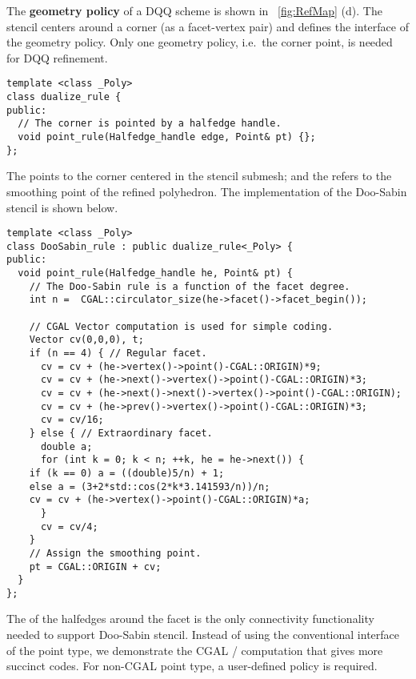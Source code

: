 \noindent The \textbf{geometry policy} of a DQQ scheme is shown in
\figurename\ \ref{fig:RefMap} (d). The stencil centers around
a corner (as a facet-vertex pair) and defines the interface 
of the geometry policy. Only one geometry policy, i.e.\ the corner 
point, is needed for DQQ refinement. 
\begin{lstlisting}
template <class _Poly>
class dualize_rule {
public:
  // The corner is pointed by a halfedge handle.
  void point_rule(Halfedge_handle edge, Point& pt) {};
};
\end{lstlisting}
The  points to the 
corner centered in the stencil submesh; and the 
 refers to the smoothing point
of the refined polyhedron. The implementation of the
Doo-Sabin stencil is shown below.
\begin{lstlisting}
template <class _Poly>
class DooSabin_rule : public dualize_rule<_Poly> {
public:
  void point_rule(Halfedge_handle he, Point& pt) {
    // The Doo-Sabin rule is a function of the facet degree.
    int n =  CGAL::circulator_size(he->facet()->facet_begin());

    // CGAL Vector computation is used for simple coding.
    Vector cv(0,0,0), t;
    if (n == 4) { // Regular facet.
      cv = cv + (he->vertex()->point()-CGAL::ORIGIN)*9;
      cv = cv + (he->next()->vertex()->point()-CGAL::ORIGIN)*3;
      cv = cv + (he->next()->next()->vertex()->point()-CGAL::ORIGIN);
      cv = cv + (he->prev()->vertex()->point()-CGAL::ORIGIN)*3;
      cv = cv/16;
    } else { // Extraordinary facet.
      double a;
      for (int k = 0; k < n; ++k, he = he->next()) {
	if (k == 0) a = ((double)5/n) + 1;
	else a = (3+2*std::cos(2*k*3.141593/n))/n;
	cv = cv + (he->vertex()->point()-CGAL::ORIGIN)*a;
      }
      cv = cv/4;
    }
    // Assign the smoothing point.
    pt = CGAL::ORIGIN + cv;
  }
};
\end{lstlisting}
The  of the halfedges around the 
facet is the only connectivity functionality needed 
to support Doo-Sabin stencil. 
Instead of using the conventional interface \CodeFmt{[i]} 
of the point type, we demonstrate the CGAL 
/ computation that gives
more succinct codes. For non-CGAL point type, a user-defined 
policy is required. 
\\

